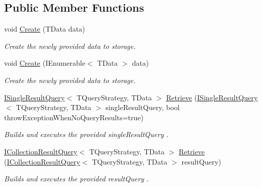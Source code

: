 \subsection*{Public Member Functions}
\begin{DoxyCompactItemize}
\item 
void \hyperlink{interfaceCqrs_1_1Repositories_1_1IRepository_a240c8d094207a22b0c805a5c830d8615_a240c8d094207a22b0c805a5c830d8615}{Create} (T\+Data data)
\begin{DoxyCompactList}\small\item\em Create the newly provided {\itshape data}  to storage. \end{DoxyCompactList}\item 
void \hyperlink{interfaceCqrs_1_1Repositories_1_1IRepository_ae3481fb2ecb0146308e07a9dd6af8c14_ae3481fb2ecb0146308e07a9dd6af8c14}{Create} (I\+Enumerable$<$ T\+Data $>$ data)
\begin{DoxyCompactList}\small\item\em Create the newly provided {\itshape data}  to storage. \end{DoxyCompactList}\item 
\hyperlink{interfaceCqrs_1_1Repositories_1_1Queries_1_1ISingleResultQuery}{I\+Single\+Result\+Query}$<$ T\+Query\+Strategy, T\+Data $>$ \hyperlink{interfaceCqrs_1_1Repositories_1_1IRepository_a65848508067b81e82da72af2063f2c07_a65848508067b81e82da72af2063f2c07}{Retrieve} (\hyperlink{interfaceCqrs_1_1Repositories_1_1Queries_1_1ISingleResultQuery}{I\+Single\+Result\+Query}$<$ T\+Query\+Strategy, T\+Data $>$ single\+Result\+Query, bool throw\+Exception\+When\+No\+Query\+Results=true)
\begin{DoxyCompactList}\small\item\em Builds and executes the provided {\itshape single\+Result\+Query} . \end{DoxyCompactList}\item 
\hyperlink{interfaceCqrs_1_1Repositories_1_1Queries_1_1ICollectionResultQuery}{I\+Collection\+Result\+Query}$<$ T\+Query\+Strategy, T\+Data $>$ \hyperlink{interfaceCqrs_1_1Repositories_1_1IRepository_a0faeb50aa395d63ccd81e66906360e81_a0faeb50aa395d63ccd81e66906360e81}{Retrieve} (\hyperlink{interfaceCqrs_1_1Repositories_1_1Queries_1_1ICollectionResultQuery}{I\+Collection\+Result\+Query}$<$ T\+Query\+Strategy, T\+Data $>$ result\+Query)
\begin{DoxyCompactList}\small\item\em Builds and executes the provided {\itshape result\+Query} . \end{DoxyCompactList}\item 

\end{DoxyCompactItemize}
